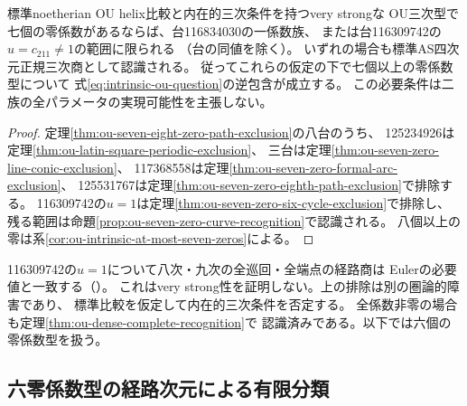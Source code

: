 \begin{corollary}
\label{cor:ou-seven-zero-complete-recognition}
標準noetherian OU helix比較と内在的三次条件を持つvery strongな
OU三次型で七個の零係数があるならば、台116834030の一係数族、
または台116309742の$u=c_{211}\ne1$の範囲に限られる
（台の同値を除く）。
いずれの場合も標準AS四次元正規三次商として認識される。
従ってこれらの仮定の下で七個以上の零係数型について
式\eqref{eq:intrinsic-ou-question}の逆包含が成立する。
この必要条件は二族の全パラメータの実現可能性を主張しない。
\end{corollary}
\begin{proof}
定理\ref{thm:ou-seven-eight-zero-path-exclusion}の八台のうち、
125234926は定理\ref{thm:ou-latin-square-periodic-exclusion}、
三台は定理\ref{thm:ou-seven-zero-line-conic-exclusion}、
117368558は定理\ref{thm:ou-seven-zero-formal-arc-exclusion}、
125531767は定理\ref{thm:ou-seven-zero-eighth-path-exclusion}で排除する。
116309742の$u=1$は定理\ref{thm:ou-seven-zero-six-cycle-exclusion}で排除し、
残る範囲は命題\ref{prop:ou-seven-zero-curve-recognition}で認識される。
八個以上の零は系\ref{cor:ou-intrinsic-at-most-seven-zeros}による。
\end{proof}

\begin{remark}
116309742の$u=1$について八次・九次の全巡回・全端点の経路商は
Eulerの必要値と一致する（）。
これはvery strong性を証明しない。上の排除は別の圏論的障害であり、
標準比較を仮定して内在的三次条件を否定する。
全係数非零の場合も定理\ref{thm:ou-dense-complete-recognition}で
認識済みである。以下では六個の零係数型を扱う。
\end{remark}

\subsection{六零係数型の経路次元による有限分類}
\label{subsec:ou-six-zero-paths}

